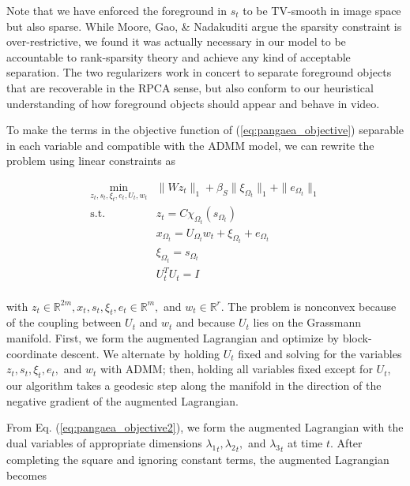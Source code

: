 \documentclass[10pt,twocolumn,letterpaper]{article}
\begin{document}
Note that we have enforced the foreground in $s_t$ to be TV-smooth in image space but also sparse. While Moore, Gao, \& Nadakuditi \cite{B.Moore} argue the sparsity constraint is over-restrictive, we found it was actually necessary in our model to be accountable to rank-sparsity theory and achieve any kind of acceptable separation. The two regularizers work in concert to separate foreground objects that are recoverable in the RPCA sense, but also conform to our heuristical understanding of how foreground objects should appear and behave in video. 

To make the terms in the objective function of (\ref{eq:pangaea_objective}) separable in each variable and compatible with the ADMM model, we can rewrite the problem using linear constraints as 

\begin{equation}
\begin{split}
	\min_{z_{t},s_{t},\xi_t,e_{t},U_{t},w_t} & \|Wz_t\|_1 + \beta_S\|\xi_{\Omega_t} \|_1+ \|e_{\Omega_t}\|_1 \\
	\text{s.t. } &z_t = C\chi_{\Omega_t}(s_{\Omega_t}) \\
	& x_{\Omega_t} = U_{\Omega_t}w_t + \xi_{\Omega_t} + e_{\Omega_t} \\
	& \xi_{\Omega_t} = s_{\Omega_t} \\
	&U_{t}^T U_{t} = I \\
\end{split}
\label{eq:pangaea_objective2}
\end{equation}

\noindent with $z_t \in \mathbb{R}^{2m}, x_t, s_t,\xi_t,e_t \in \mathbb{R}^m,$ and $w_t \in \mathbb{R}^r$.  The problem is nonconvex because of the coupling between $U_t$ and $w_t$ and because $U_t$ lies on the Grassmann manifold. First, we form the augmented Lagrangian and optimize by block-coordinate descent. We alternate by holding $U_t$ fixed and solving for the variables $z_{t},s_{t},\xi_t,e_{t},$ and $w_t$ with ADMM; then, holding all variables fixed except for $U_t$, our algorithm takes a geodesic step along the manifold in the direction of the negative gradient of the augmented Lagrangian. 

From Eq. (\ref{eq:pangaea_objective2}), we form the augmented Lagrangian with the dual variables of appropriate dimensions ${\lambda_1}_t, {\lambda_2}_t,$ and ${\lambda_3}_t$ at time $t$. After completing the square and ignoring constant terms, the augmented Lagrangian becomes
\end{document}
